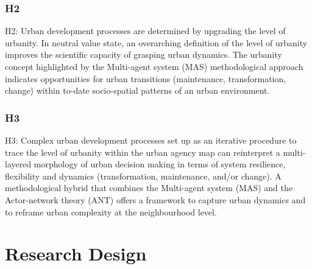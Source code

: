 \documentclass[11pt]{report}
\begin{document}
\subsubsection{H2}

H2:  Urban development processes are determined  by  upgrading the  level  of  urbanity.  In neutral value state, an overarching definition of the level of urbanity improves the scientific capacity of grasping urban dynamics. The urbanity concept highlighted by the Multi-agent system (MAS) methodological approach indicates opportunities for urban transitions (maintenance, transformation, change) within to-date socio-spatial patterns of an urban environment. 

\subsubsection{H3}

H3: Complex urban development processes set up as an iterative procedure to trace the level of urbanity within the urban agency map can reinterpret a multi-layered morphology of urban decision making in terms of system resilience, flexibility and dynamics (transformation, maintenance, and/or change). A methodological hybrid that combines the Multi-agent system (MAS) and the Actor-network theory (ANT) offers a framework to capture urban dynamics and to reframe urban complexity at the neighbourhood level.

\section{Research Design}
\end{document}
